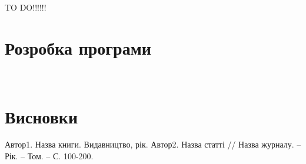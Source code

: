 \documentclass[a4paper,14pt]{report}
\begin{document}
TO DO!!!!!!


\chapter{Розробка програми}
\

\chapter{Висновки}

\begin{thebibliography}{9}
 Автор1. Назва книги. Видавництво, рік.
 Автор2. Назва статті // Назва журналу. -- Рік. -- Том. -- С. 100-200.
\end{thebibliography}
\end{document}
